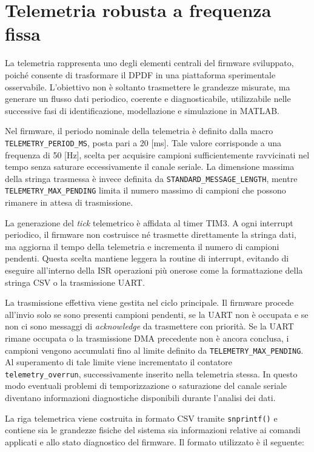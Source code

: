 \documentclass[11pt]{report}
\begin{document}
\section{Telemetria robusta a frequenza fissa}
La telemetria rappresenta uno degli elementi centrali del firmware sviluppato, poiché consente di trasformare il DPDF in una piattaforma sperimentale osservabile. L'obiettivo non è soltanto trasmettere le grandezze misurate, ma generare un flusso dati periodico, coerente e diagnosticabile, utilizzabile nelle successive fasi di identificazione, modellazione e simulazione in MATLAB.

Nel firmware, il periodo nominale della telemetria è definito dalla macro \texttt{TELEMETRY\_PERIOD\_MS}, posta pari a 20 [ms]. Tale valore corrisponde a una frequenza di 50 [Hz], scelta per acquisire campioni sufficientemente ravvicinati nel tempo senza saturare eccessivamente il canale seriale. La dimensione massima della stringa trasmessa è invece definita da \texttt{STANDARD\_MESSAGE\_LENGTH}, mentre \texttt{TELEMETRY\_MAX\_PENDING} limita il numero massimo di campioni che possono rimanere in attesa di trasmissione.

La generazione del \textit{tick} telemetrico è affidata al timer TIM3. A ogni interrupt periodico, il firmware non costruisce né trasmette direttamente la stringa dati, ma aggiorna il tempo della telemetria e incrementa il numero di campioni pendenti. Questa scelta mantiene leggera la routine di interrupt, evitando di eseguire all'interno della ISR operazioni più onerose come la formattazione della stringa CSV o la trasmissione UART.

La trasmissione effettiva viene gestita nel ciclo principale. Il firmware procede all'invio solo se sono presenti campioni pendenti, se la UART non è occupata e se non ci sono messaggi di \textit{acknowledge} da trasmettere con priorità. Se la UART rimane occupata o la trasmissione DMA precedente non è ancora conclusa, i campioni vengono accumulati fino al limite definito da \texttt{TELEMETRY\_MAX\_PENDING}. Al superamento di tale limite viene incrementato il contatore \texttt{telemetry\_overrun}, successivamente inserito nella telemetria stessa. In questo modo eventuali problemi di temporizzazione o saturazione del canale seriale diventano informazioni diagnostiche disponibili durante l'analisi dei dati.

La riga telemetrica viene costruita in formato CSV tramite \texttt{snprintf()} e contiene sia le grandezze fisiche del sistema sia informazioni relative ai comandi applicati e allo stato diagnostico del firmware. Il formato utilizzato è il seguente:
\end{document}
